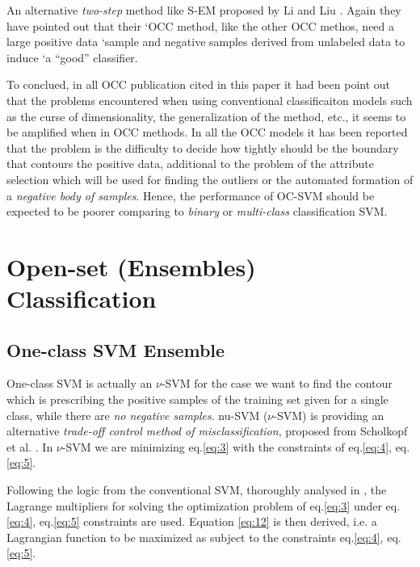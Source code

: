 An alternative \textit{two-step} method like S-EM proposed by Li and Liu \cite{li2003learning}. Again they have pointed out that their `OCC method, like the other OCC methos, need a large positive data `sample and negative samples derived from unlabeled data to induce `a ``good'' classifier.

To conclued, in all OCC publication cited in this paper it had been point out that the problems encountered when using conventional classificaiton models such as the curse of dimensionality, the generalization of the method, etc., it seems to be amplified when in OCC methods. In all the OCC models it has been reported that the problem is the difficulty to decide how tightly should be the boundary that contours the positive data, additional to the problem of the attribute selection which will be used for finding the outliers or the automated formation of a \textit{negative body of samples}. Hence, the performance of OC-SVM should be expected to be poorer comparing to \textit{binary }or \textit{multi-class} classification SVM\cite{khan2010survey,manevitz2002one,yu2005single,scholkopf1999estimating,li2003learning}.

\section{Open-set (Ensembles) Classification}\label{chap:openset:sec:Openset_Class_Classification}

\subsection{One-class SVM Ensemble}\label{sec:OC-SVM_Description}
One-class SVM is actually an $\nu$-SVM for the case we want to find the contour which is prescribing the positive samples of the training set given for a single class, while there are \textit{no negative samples}. nu-SVM ($\nu$-SVM) is providing an alternative \textit{trade-off control method of misclassification}, proposed from Scholkopf et al. \citep{scholkopf1999estimating}. In $\nu$-SVM we are minimizing eq.\ref{eq:3} with the constraints of eq.\ref{eq:4}, eq.\ref{eq:5}.

Following the logic from the conventional SVM, thoroughly analysed in \citep{bishop2006}, the Lagrange multipliers for solving the optimization problem of eq.\ref{eq:3} under eq.\ref{eq:4}, eq.\ref{eq:5} constraints are used. Equation \ref{eq:12} is then derived, i.e. a Lagrangian function to be maximized as subject to the constraints eq.\ref{eq:4}, eq.\ref{eq:5}.

